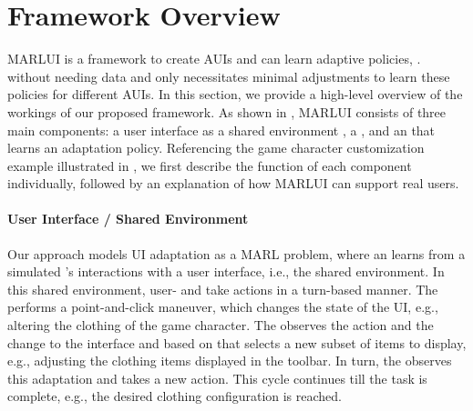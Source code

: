 \section{Framework Overview}

MARLUI is a framework to create AUIs  and can learn adaptive policies, .  without needing data and only necessitates minimal adjustments to learn these policies for different AUIs. 
In this section, we provide a high-level overview of the workings of our proposed framework.
As shown in , MARLUI consists of three main components: a user interface as a shared environment ,  a \useragent {}, and an \interfaceagent that learns an adaptation policy. 
Referencing the game character customization example illustrated in , we first describe the function of each component individually, followed by an explanation of how MARLUI can support real users.


\paragraph*{User Interface / Shared Environment}
Our approach models UI adaptation as a MARL problem, where an \interfaceagent learns from a simulated \useragent's interactions with a user interface, i.e., the shared environment. In this shared environment, user- and \interfaceagent take actions in a turn-based manner. The \useragent performs a point-and-click maneuver, which changes the state of the UI, e.g., altering the clothing of the game character. The \interfaceagent observes the action and the change to the interface and based on that selects a new subset of items to display, e.g., adjusting the clothing items displayed in the toolbar.
In turn, the \useragent observes this adaptation and takes a new action. This cycle continues till the task is complete, e.g., the desired clothing configuration is reached. 

